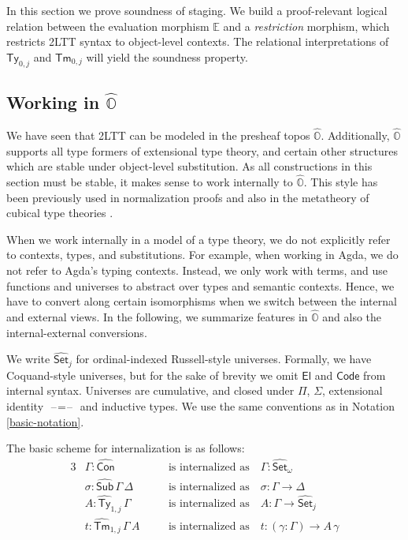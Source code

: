 \documentclass[acmsmall]{acmart}
\newcommand{\msf}[1]{\mathsf{#1}}
\newcommand{\mbb}[1]{\mathbb{#1}}
\newcommand{\wh}[1]{\widehat{#1}}
\newcommand{\Code}{\msf{Code}}
\newcommand{\El}{\msf{El}}
\newcommand{\mbbo}{\mbb{O}}
\newcommand{\Ty}{\msf{Ty}}
\newcommand{\Tm}{\msf{Tm}}
\newcommand{\hCon}{\wh{\msf{Con}}}
\newcommand{\hSub}{\wh{\msf{Sub}}}
\newcommand{\hTy}{\wh{\msf{Ty}}}
\newcommand{\hTm}{\wh{\msf{Tm}}}
\newcommand{\Set}{\mathsf{Set}}
\newcommand{\blank}{{\mathord{\hspace{1pt}\text{--}\hspace{1pt}}}}
\newcommand{\hato}{\bm\hat{\mbbo}}
\newcommand{\ev}{\mbb{E}}
\theoremstyle{remark}
\newcommand{\whset}{\wh{\Set}}
\begin{document}
In this section we prove soundness of staging. We build a proof-relevant logical
relation between the evaluation morphism $\ev$ and a \emph{restriction}
morphism, which restricts 2LTT syntax to object-level contexts. The relational
interpretations of $\Ty_{0,j}$ and $\Tm_{0,j}$ will yield the soundness
property.

\subsection{Working in $\hat{\mbbo}$}

We have seen that 2LTT can be modeled in the presheaf topos
$\hato$. Additionally, $\hato$ supports all type formers of extensional type
theory, and certain other structures which are stable under object-level
substitution. As all constructions in this section must be stable, it makes
sense to work internally to $\hato$. This style has been previously used in
normalization proofs \cite{coquand2018canonicity} and also in the metatheory of
cubical type theories
\cite{licata2018internal,orton_et_al:LIPIcs:2016:6564,DBLP:conf/csl/CavalloMS20}.

When we work internally in a model of a type theory, we do not explicitly refer
to contexts, types, and substitutions. For example, when working in Agda, we do
not refer to Agda's typing contexts. Instead, we only work with terms, and use
functions and universes to abstract over types and semantic contexts. Hence, we
have to convert along certain isomorphisms when we switch between the internal
and external views. In the following, we summarize features in $\hato$ and also
the internal-external conversions.

We write $\whset_j$ for ordinal-indexed Russell-style universes. Formally, we
have Coquand-style universes, but for the sake of brevity we omit $\El$ and
$\Code$ from internal syntax. Universes are cumulative, and closed under $\Pi$,
$\Sigma$, extensional identity $\blank\!=\!\blank$ and inductive types. We use
the same conventions as in Notation \ref{basic-notation}.

\noindent The basic scheme for internalization is as follows:
\begin{alignat*}{3}
  & \Gamma : \hCon                  && \hspace{1em}\text{is internalized as}\hspace{1em} \Gamma : \whset_\omega\\
  & \sigma : \hSub\,\Gamma\,\Delta  && \hspace{1em}\text{is internalized as}\hspace{1em} \sigma : \Gamma \to \Delta\\
  & A : \hTy_{1,j}\,\Gamma           && \hspace{1em}\text{is internalized as}\hspace{1em} A      : \Gamma \to \whset_j \\
  & t : \hTm_{1,j}\,\Gamma\,A        && \hspace{1em}\text{is internalized as}\hspace{1em} t      : (\gamma : \Gamma) \to A\,\gamma
\end{alignat*}
\end{document}
